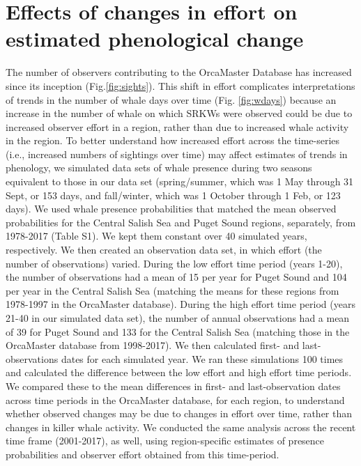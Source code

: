 \documentclass{article}
\begin{document}
\section* {Effects of changes in effort on estimated phenological change}
The number of observers contributing to the OrcaMaster Database has increased since its inception (Fig.\ref{fig:sights}). This shift in effort complicates interpretations of trends in the number of whale days over time (Fig. \ref{fig:wdays}) because an increase in the number of whale on which SRKWs were observed could be due to increased observer effort in a region, rather than due to increased whale activity in the region. To better understand how increased effort across the time-series (i.e., increased numbers of sightings over time) may affect estimates of trends in phenology, we simulated data sets of whale presence during two seasons equivalent to those in our data set (spring/summer, which was 1 May through 31 Sept, or 153 days, and fall/winter, which was 1 October through 1 Feb, or 123 days). We used whale presence probabilities that matched the mean observed probabilities for the Central Salish Sea and Puget Sound regions, separately, from 1978-2017 (Table S1). We kept them constant over 40 simulated years, respectively. We then created an observation data set, in which effort (the number of observations) varied. During the low effort time period (years 1-20), the number of observations had a mean of 15 per year for Puget Sound and 104 per year in the Central Salish Sea (matching the means for these regions from 1978-1997 in the OrcaMaster database). During the high effort time period (years 21-40 in our simulated data set), the number of annual observations had a mean of 39 for Puget Sound and 133 for the Central Salish Sea (matching those in the OrcaMaster database from 1998-2017). We then calculated first- and last- observations dates for each simulated year. We ran these simulations 100 times and calculated the difference between the low effort and high effort time periods. We compared these to the mean differences in first- and last-observation dates across time periods in the OrcaMaster database, for each region, to understand whether observed changes may be due to changes in effort over time, rather than changes in killer whale activity. We conducted the same analysis across the recent time frame (2001-2017), as well, using region-specific estimates of presence probabilities and observer effort obtained from this time-period.
\end{document}

